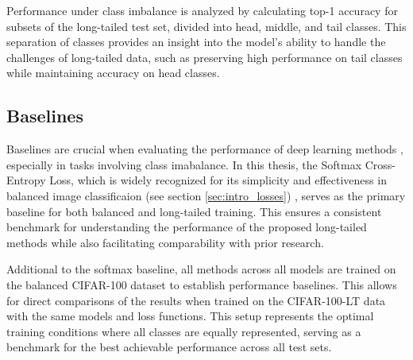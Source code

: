 Performance under class imbalance is analyzed by calculating top-1 accuracy for subsets of the long-tailed test set, divided into head, middle, and tail classes. This separation of classes provides an insight into the model's ability to handle the challenges of long-tailed data, such as preserving high performance on tail classes while maintaining accuracy on head classes.


\subsection{Baselines}
Baselines are crucial when evaluating the performance of deep learning methods , especially in tasks involving class imabalance. In this thesis, the Softmax Cross-Entropy Loss, which is widely recognized for its simplicity and effectiveness in balanced image classificaion (see section \ref{sec:intro_losses}) , serves as the primary baseline for both balanced and long-tailed training. This ensures a consistent benchmark for understanding the performance of the proposed long-tailed methods while also facilitating comparability with prior research.

Additional to the softmax baseline, all methods across all models are trained on the balanced CIFAR-100 dataset to establish performance baselines. This allows for direct comparisons of the results when trained on the CIFAR-100-LT data with the same models and loss functions. This setup represents the optimal training conditions where all classes are equally represented, serving as a benchmark for the best achievable performance across all test sets.


